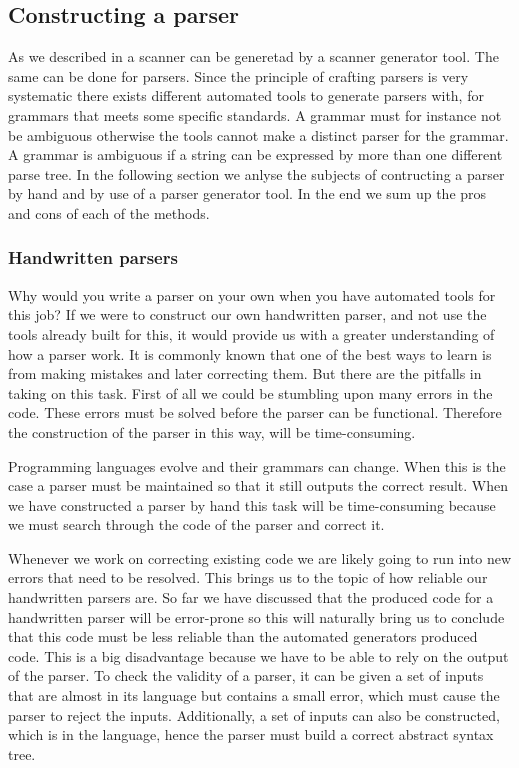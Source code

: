 \subsection{Constructing a parser}
\label{subsec:constructingaparser}
As we described in  a scanner can be generetad by a
scanner generator tool. The same can be done for parsers. Since the principle of 
crafting parsers is very systematic there exists
different automated tools to generate parsers with, for grammars that meets
some specific standards. A grammar must for instance not be ambiguous otherwise the tools
cannot make a distinct parser for the grammar. A grammar is ambiguous if a
string can be expressed by more than one different parse tree. In the following section we
anlyse the subjects of contructing a parser by hand and by use of a parser generator
tool. In the end we sum up the pros and cons of each of the methods. 

\subsubsection{Handwritten parsers}
\label{subsec:handwrittenparsers}
Why would you write a parser on your own when you have automated tools for this
job? If we were to construct our own handwritten parser, and not use the tools
already built for this, it would provide us with a greater understanding of how a parser 
work. It is commonly known that one of the best ways to learn is from making mistakes and 
later correcting them. But there are the pitfalls in taking on this task. First of all we 
could be stumbling upon many errors in the code. These errors must be solved before the
parser can be functional. Therefore the construction of the parser in this way, will be
time-consuming.

Programming languages evolve and their grammars can change. When this is the case a 
parser must be maintained so that it still outputs the correct result.
When we have constructed a parser by hand this task will be time-consuming because
we must search through the code of the parser and correct it. 

Whenever we work on correcting existing code we are likely going to run into new errors 
that need to be resolved. This brings us to the topic of how reliable our handwritten 
parsers are. So far we have discussed that the produced code for a handwritten parser 
will be error-prone so this will naturally bring us to conclude that this code must be 
less reliable than the automated generators produced code. This is a big disadvantage because we have to be able to rely on the
output of the parser. To check the validity of a parser, it can be given a set
of inputs that are almost in its language but contains a small error, which must
cause the parser to reject the inputs. Additionally, a set of inputs can also be
constructed, which is in the language, hence the parser must build a
correct abstract syntax tree.

